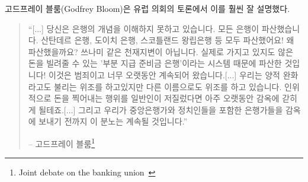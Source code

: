\begin{comment}
	Godfrey Bloom, addressing the European Parliament during a joint
	debate, said it way better than I ever could:
\end{comment}
고드프레이 블룸(Godfrey Bloom)은 유럽 의회의 토론에서 이를 훨씬 잘 설명했다.

\begin{comment}
	\begin{quotation}\begin{samepage}
			\enquote{[...] you do not really understand the concept of banking. All the
				banks are broke. Bank Santander, Deutsche Bank, Royal Bank of
				Scotland --- they're all broke! And why are they broke? It isn't an
				act of God. It isn't some sort of tsunami. They're broke because we
				have a system called `fractional reserve banking' which means that
				banks can lend money that they don't actually have! It's a criminal
				scandal and it's been going on for too long. [...]
				We have counterfeiting --- sometimes called quantitative
				easing --- but counterfeiting by any other name. The artificial
				printing of money which, if any ordinary person did, they'd go to
				prison for a very long time [...] and until we start sending
				bankers --- and I include central bankers and politicians --- to
				prison for this outrage it will continue.}
			\begin{flushright} -- Godfrey Bloom\footnote{Joint debate on the
					banking union~\cite{godfrey-bloom}}
	\end{flushright}\end{samepage}\end{quotation}
\end{comment}
\begin{quotation}\begin{samepage}
		\enquote{[...] 당신은 은행의 개념을 이해하지 못하고 있습니다. 
			모든 은행이 파산했습니다. 산탄데르 은행, 도이치 은행, 스코틀랜드 왕립은행 등 모두 파산했어요!
			왜 파산했을까요? 쓰나미 같은 천재지변이 아닙니다. 
			실제로 가지고 있지도 않은 돈을 빌려줄 수 있는 '부분 지급 준비금 은행'이라는 시스템 때문에 파산한 것입니다! 
			이것은 범죄이고 너무 오랫동안 계속되어 왔습니다.[...]	
			우리는 양적 완화라고도 불리는 위조를 하고있지만 다른 이름으로도 위조를 하고 있습니다.
			인위적으로 돈을 찍어내는 행위를 일반인이 저질렀다면 아주 오랫동안 감옥에 갇히게 될테죠.[...] 
			그리고 우리가 중앙은행가와 정치인들을 포함한 은행가들을 감옥에 보내기 전까지 이 분노는 계속될 것입니다.}
		\begin{flushright} -- 고드프레이 블룸\footnote{Joint debate on the
				banking union~\cite{godfrey-bloom}}
\end{flushright}\end{samepage}\end{quotation}

